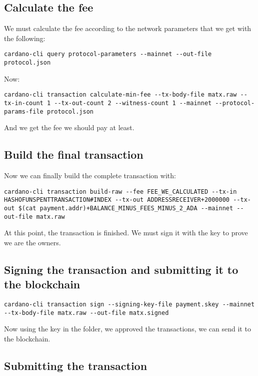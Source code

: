 \subsection*{Calculate the fee}

We must calculate the fee according to the network parameters that we get with the following:

\begin{lstlisting}
cardano-cli query protocol-parameters --mainnet --out-file protocol.json
\end{lstlisting}

Now:

\begin{lstlisting}
cardano-cli transaction calculate-min-fee --tx-body-file matx.raw --tx-in-count 1 --tx-out-count 2 --witness-count 1 --mainnet --protocol-params-file protocol.json
\end{lstlisting}

And we get the fee we should pay at least.

\subsection*{Build the final transaction}

Now we can finally build the complete transaction with:

\begin{lstlisting}
cardano-cli transaction build-raw --fee FEE_WE_CALCULATED --tx-in HASHOFUNSPENTTRANSACTION#INDEX --tx-out ADDRESSRECEIVER+2000000 --tx-out $(cat payment.addr)+BALANCE_MINUS_FEES_MINUS_2_ADA --mainnet --out-file matx.raw
\end{lstlisting}

At this point, the transaction is finished. We must sign it with the key to prove we are the owners.

\subsection*{Signing the transaction and submitting it to the blockchain}

\begin{lstlisting}
cardano-cli transaction sign --signing-key-file payment.skey --mainnet --tx-body-file matx.raw --out-file matx.signed
\end{lstlisting}

Now using the key in the folder, we approved the transactions, we can send it to the blockchain.

\subsection*{Submitting the transaction}

